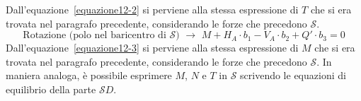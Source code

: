 Dall'equazione~\eqref{equazione12-2} si perviene alla stessa espressione di $T$ che si era trovata nel paragrafo precedente, considerando le forze che precedono $\mathcal{S}$. 
\begin{equation} \label{equazione12-3}
\boxed{ \text{Rotazione (polo nel baricentro di } \mathcal{S})} \,\, \longrightarrow \,\, M + H_{A}\cdot b_{1} - V_{A}\cdot b_{2} + Q'\cdot b_{3} = 0 \tag{12.3}
\end{equation}
Dall'equazione~\eqref{equazione12-3} si perviene alla stessa espressione di $M$ che si era trovata nel paragrafo precedente, considerando le forze che precedono $\mathcal{S}$. In maniera analoga, è possibile esprimere $M$, $N$ e $T$ in $\mathcal{S}$ scrivendo le equazioni di equilibrio della parte $\mathcal{S}D$. 
